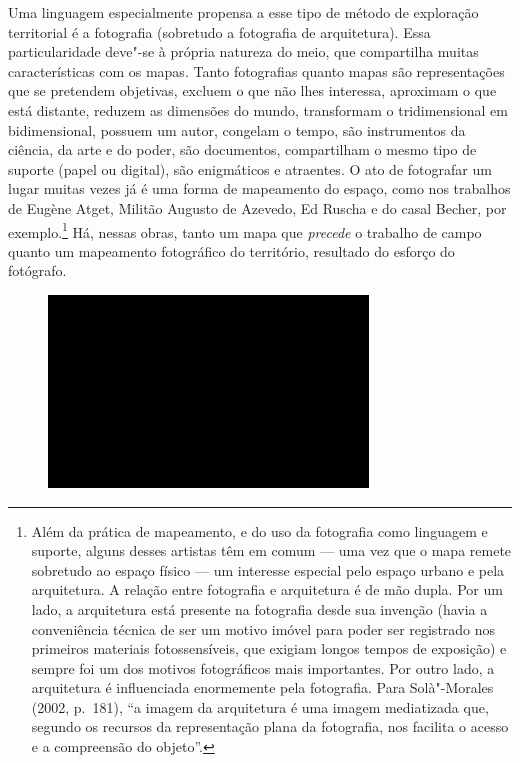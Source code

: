 Uma linguagem especialmente propensa a esse tipo de método de exploração
territorial é a fotografia (sobretudo a fotografia de arquitetura). Essa
particularidade deve"-se à própria natureza do meio, que compartilha
muitas características com os mapas. Tanto fotografias quanto mapas são
representações que se pretendem objetivas, excluem o que não lhes
interessa, aproximam o que está distante, reduzem as dimensões do mundo,
transformam o tridimensional em bidimensional, possuem um autor,
congelam o tempo, são instrumentos da ciência, da arte e do poder, são
documentos, compartilham o mesmo tipo de suporte (papel ou digital), são enigmáticos e atraentes. O ato de fotografar um
lugar muitas vezes já é uma forma de mapeamento do espaço, como nos
trabalhos de Eugène Atget, Militão Augusto de Azevedo, Ed Ruscha e do
casal Becher, por exemplo.\footnote{Além da prática de mapeamento, e do
  uso da fotografia como linguagem e suporte, alguns desses artistas têm
  em comum --- uma vez que o mapa remete sobretudo ao espaço físico --- um
  interesse especial pelo espaço urbano e pela arquitetura. A relação
  entre fotografia e arquitetura é de mão dupla. Por um lado, a
  arquitetura está presente na fotografia desde sua invenção (havia a
  conveniência técnica de ser um motivo imóvel para poder ser registrado
  nos primeiros materiais fotossensíveis, que exigiam longos tempos de
  exposição) e sempre foi um dos motivos fotográficos mais importantes.
  Por outro lado, a arquitetura é influenciada enormemente pela
  fotografia. Para Solà"-Morales (2002, p.~181), ``a imagem da
  arquitetura é uma imagem mediatizada que, segundo os recursos da
  representação plana da fotografia, nos facilita o acesso e a
  compreensão do objeto''.}
  Há, nessas obras, tanto um mapa que \emph{precede} o trabalho de campo quanto um mapeamento fotográfico do território, resultado do esforço do fotógrafo.

\begin{figure}[!ht]

\centering
 \includegraphics[width=85mm]{./imgs/im1.jpg}
\caption{\tiny{}}

\end{figure}

